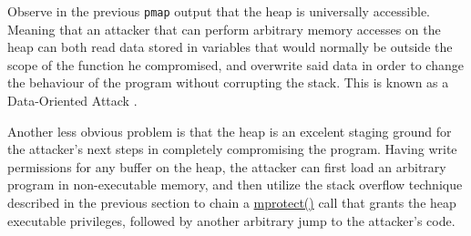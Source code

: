 Observe in the previous \texttt{pmap} output that the heap is universally
accessible. Meaning that an attacker that can perform arbitrary memory accesses
on the heap can both read data stored in variables that would normally be
outside the scope of the function he compromised, and overwrite said data in
order to change the behaviour of the program without corrupting the stack. This
is known as a Data-Oriented Attack \cite{cheng2019exploitation}.

Another less obvious problem is that the heap is an excelent staging ground
for the attacker's next steps in completely compromising the program. Having
write permissions for any buffer on the heap, the attacker can first load an
arbitrary program in non-executable memory, and then utilize the stack overflow
technique described in the previous section to chain a
\href{https://man7.org/linux/man-pages/man2/mprotect.2.html}{mprotect()} call
that grants the heap executable privileges, followed by another arbitrary jump
to the attacker's code.

